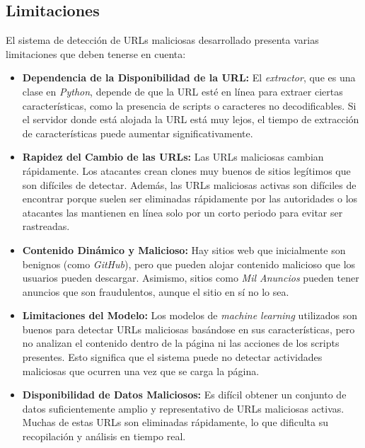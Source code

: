 \subsection{Limitaciones}

El sistema de detección de URLs maliciosas desarrollado presenta varias limitaciones que deben tenerse en cuenta:

\begin{itemize}
    \item \textbf{Dependencia de la Disponibilidad de la URL:} El \textit{extractor}, que es una clase en \textit{Python}, depende de que la URL esté en línea para extraer ciertas características, como la presencia de scripts o caracteres no decodificables. Si el servidor donde está alojada la URL está muy lejos, el tiempo de extracción de características puede aumentar significativamente.
    
    \item \textbf{Rapidez del Cambio de las URLs:} Las URLs maliciosas cambian rápidamente. Los atacantes crean clones muy buenos de sitios legítimos que son difíciles de detectar. Además, las URLs maliciosas activas son difíciles de encontrar porque suelen ser eliminadas rápidamente por las autoridades o los atacantes las mantienen en línea solo por un corto periodo para evitar ser rastreadas.

    \item \textbf{Contenido Dinámico y Malicioso:} Hay sitios web que inicialmente son benignos (como \textit{GitHub}), pero que pueden alojar contenido malicioso que los usuarios pueden descargar. Asimismo, sitios como \textit{Mil Anuncios} pueden tener anuncios que son fraudulentos, aunque el sitio en sí no lo sea.

    \item \textbf{Limitaciones del Modelo:} Los modelos de \textit{machine learning} utilizados son buenos para detectar URLs maliciosas basándose en sus características, pero no analizan el contenido dentro de la página ni las acciones de los scripts presentes. Esto significa que el sistema puede no detectar actividades maliciosas que ocurren una vez que se carga la página.

    \item \textbf{Disponibilidad de Datos Maliciosos:} Es difícil obtener un conjunto de datos suficientemente amplio y representativo de URLs maliciosas activas. Muchas de estas URLs son eliminadas rápidamente, lo que dificulta su recopilación y análisis en tiempo real.
\end{itemize}
